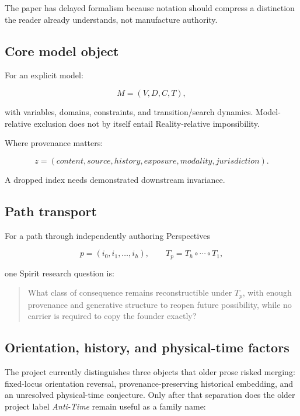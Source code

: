 \documentclass[11pt]{article}
\begin{document}
The paper has delayed formalism because notation should compress a distinction the reader already understands, not manufacture authority.

\subsection{Core model object}

For an explicit model:

\begin{equation}
M=(V,D,C,T),
\end{equation}

with variables, domains, constraints, and transition/search dynamics. Model-relative exclusion does not by itself entail Reality-relative impossibility.

Where provenance matters:

\begin{equation}
z=(content,source,history,exposure,modality,jurisdiction).
\end{equation}

A dropped index needs demonstrated downstream invariance.

\subsection{Path transport}

For a path through independently authoring Perspectives

\begin{equation}
p=(i_0,i_1,\ldots,i_h),\qquad T_p=T_h\circ\cdots\circ T_1,
\end{equation}

one Spirit research question is:

\begin{quote}
What class of consequence remains reconstructible under $T_p$, with enough provenance and generative structure to reopen future possibility, while no carrier is required to copy the founder exactly?
\end{quote}

\subsection{Orientation, history, and physical-time factors}

The project currently distinguishes three objects that older prose risked merging: fixed-locus orientation reversal, provenance-preserving historical embedding, and an unresolved physical-time conjecture. Only after that separation does the older project label \emph{Anti-Time} remain useful as a family name:
\end{document}
